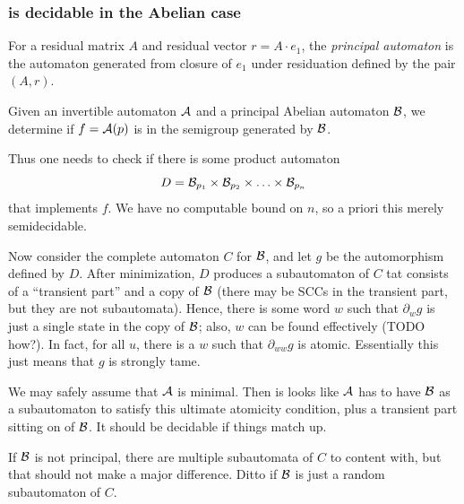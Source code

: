 \documentclass[11pt, titlepage]{article}
\begin{document}
\begin{example}
\begin{center}
\end{center}
\end{example}

\subsubsection{ is decidable in the Abelian case}

\begin{definition}
  For a residual matrix $A$ and residual vector $r = A \cdot e_1$, the
  \emph{principal automaton} is the automaton generated from closure
  of $e_1$ under residuation defined by the pair $(A, r)$.
\end{definition}

{\color{TODO}
Given an invertible automaton $\mathcal{A}$ and a principal Abelian automaton
$\mathcal{B}$, we determine if $f = \mathcal{A}(p)$ is in the semigroup generated by $\mathcal{B}$.

Thus one needs to check if there is some product automaton
\[
  D = \mathcal{B}_{p_1} \times \mathcal{B}_{p_2} \times \ldots \times \mathcal{B}_{p_n}
\]
that implements $f$. We have no computable bound on $n$, so a priori
this merely semidecidable.

Now consider the complete automaton $C$ for $\mathcal{B}$, and let $g$ be the
automorphism defined by $D$. After minimization, $D$ produces a
subautomaton of $C$ tat consists of a ``transient part'' and a copy of
$\mathcal{B}$ (there may be SCCs in the transient part, but they are not
subautomata). Hence, there is some word $w$ such that $\partial_w g$
is just a single state in the copy of $\mathcal{B}$; also, $w$ can be found
effectively (TODO how?). In fact, for all $u$, there is a $w$ such
that $\partial_{ww}g$ is atomic. Essentially this just means that $g$
is strongly tame.

We may safely assume that $\mathcal{A}$ is minimal. Then is looks like $\mathcal{A}$ has
to have $\mathcal{B}$ as a subautomaton to satisfy this ultimate atomicity
condition, plus a transient part sitting on of $\mathcal{B}$. It should be
decidable if things match up.

If $\mathcal{B}$ is not principal, there are multiple subautomata of $C$ to
content with, but that should not make a major difference. Ditto if
$\mathcal{B}$ is just a random subautomaton of $C$.

%
}
\end{document}
